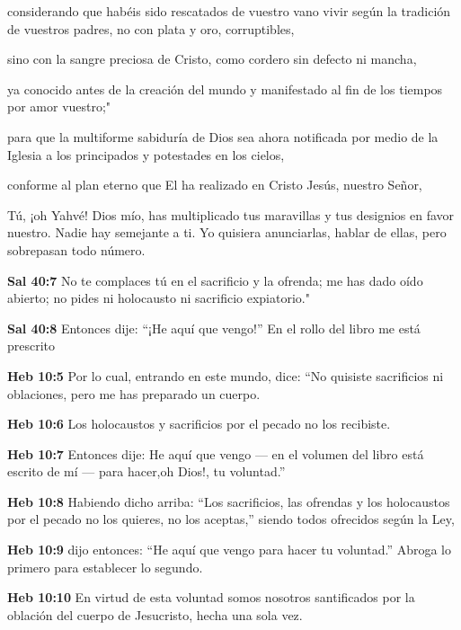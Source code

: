 \blSetBookNameMeaning{}
\blStartBook


considerando que habéis sido rescatados de vuestro vano vivir según la tradición de vuestros padres, no con plata y oro, corruptibles, 

sino con la sangre preciosa de Cristo, como cordero sin defecto ni mancha, 

ya conocido antes de la creación del mundo y manifestado al fin de los tiempos por amor vuestro;"

para que la multiforme sabiduría de Dios sea ahora notificada por medio de la Iglesia a los principados y potestades en los cielos, 

conforme al plan eterno que El ha realizado en Cristo Jesús, nuestro Señor, 

Tú, ¡oh Yahvé! Dios mío, has multiplicado tus maravillas y tus designios en favor nuestro. Nadie hay semejante a ti. Yo quisiera anunciarlas, hablar de ellas, pero sobrepasan todo número. 

\textbf{Sal 40:7} No te complaces tú en el sacrificio y la ofrenda; me has dado oído abierto; no pides ni holocausto ni sacrificio expiatorio." 

\textbf{Sal 40:8} Entonces dije: “¡He aquí que vengo!” En el rollo del libro me está prescrito 

\textbf{Heb 10:5} Por lo cual, entrando en este mundo, dice: “No quisiste sacrificios ni oblaciones, pero me has preparado un cuerpo. 

\textbf{Heb 10:6} Los holocaustos y sacrificios por el pecado no los recibiste. 

\textbf{Heb 10:7} Entonces dije: He aquí que vengo — en el volumen del libro está escrito de mí — para hacer,oh Dios!, tu voluntad.” 

\textbf{Heb 10:8} Habiendo dicho arriba: “Los sacrificios, las ofrendas y los holocaustos por el pecado no los quieres, no los aceptas,” siendo todos ofrecidos según la Ley, 

\textbf{Heb 10:9} dijo entonces: “He aquí que vengo para hacer tu voluntad.” Abroga lo primero para establecer lo segundo. 

\textbf{Heb 10:10} En virtud de esta voluntad somos nosotros santificados por la oblación del cuerpo de Jesucristo, hecha una sola vez. 



